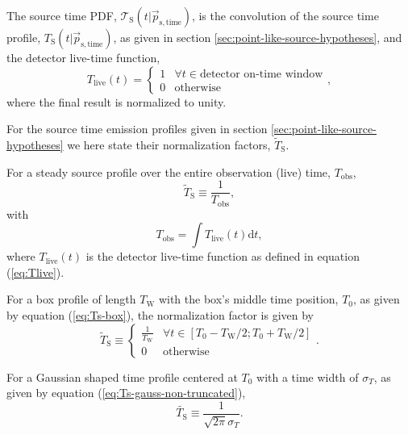 \documentclass{article}
\begin{document}
The source time PDF, $\mathcal{T}_{\mathrm{S}}(t|\vec{p}_{\mathrm{s},\mathrm{time}})$,
is the convolution of the source time profile,
$T_{\mathrm{S}}(t|\vec{p}_{\mathrm{s},\mathrm{time}})$, as given in section
\ref{sec:point-like-source-hypotheses}, and the detector live-time function,
\begin{equation}
 T_{\mathrm{live}}(t) = \begin{cases}
                         1 & \forall t \in \text{detector on-time window} \\
                         0 & \text{otherwise}
                        \end{cases},
 \label{eq:Tlive}
\end{equation}
where the final result is normalized to unity.

For the source time emission profiles given in section \ref{sec:point-like-source-hypotheses}
we here state their normalization factors, $\tilde{T}_{\mathrm{S}}$.

For a steady source profile over the entire observation (live) time,
$T_{\mathrm{obs}}$,
\begin{equation}
 \tilde{T}_{\mathrm{S}} \equiv \frac{1}{T_{\mathrm{obs}}},
\end{equation}
with
\begin{equation}
 T_{\mathrm{obs}} = \int T_{\mathrm{live}}(t) \mathrm{d}t,
 \label{eq:Tobs}
\end{equation}
where $T_{\mathrm{live}}(t)$ is the detector live-time function as defined in
equation (\ref{eq:Tlive}).

For a box profile of length $T_{\mathrm{W}}$ with the box's middle time
position, $T_{0}$, as given by equation (\ref{eq:Ts-box}), the normalization
factor is given by
\begin{equation}
 \tilde{T}_{\mathrm{S}} \equiv
   \begin{cases}
     \frac{1}{T_{\mathrm{W}}} & \forall t \in \left[T_0 - T_{\mathrm{W}}/2; T_0 + T_{\mathrm{W}}/2 \right]\\
     0 & \mathrm{otherwise}
   \end{cases}.
\end{equation}

For a Gaussian shaped time profile centered at $T_0$ with a time width of $\sigma_T$,
as given by equation (\ref{eq:Ts-gauss-non-truncated}),
\begin{equation}
 \tilde{T_{\mathrm{S}}} \equiv \frac{1}{\sqrt{2\pi}\sigma_T}.
\end{equation}
\end{document}
